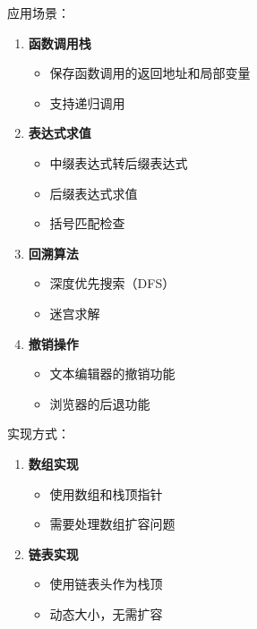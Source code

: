 应用场景：
\begin{enumerate}
  \item \textbf{函数调用栈}
    \begin{itemize}
      \item 保存函数调用的返回地址和局部变量
      \item 支持递归调用
    \end{itemize}

  \item \textbf{表达式求值}
    \begin{itemize}
      \item 中缀表达式转后缀表达式
      \item 后缀表达式求值
      \item 括号匹配检查
    \end{itemize}

  \item \textbf{回溯算法}
    \begin{itemize}
      \item 深度优先搜索（DFS）
      \item 迷宫求解
    \end{itemize}

  \item \textbf{撤销操作}
    \begin{itemize}
      \item 文本编辑器的撤销功能
      \item 浏览器的后退功能
    \end{itemize}
\end{enumerate}

实现方式：
\begin{enumerate}
  \item \textbf{数组实现}
    \begin{itemize}
      \item 使用数组和栈顶指针
      \item 需要处理数组扩容问题
    \end{itemize}

  \item \textbf{链表实现}
    \begin{itemize}
      \item 使用链表头作为栈顶
      \item 动态大小，无需扩容
    \end{itemize}
\end{enumerate}

